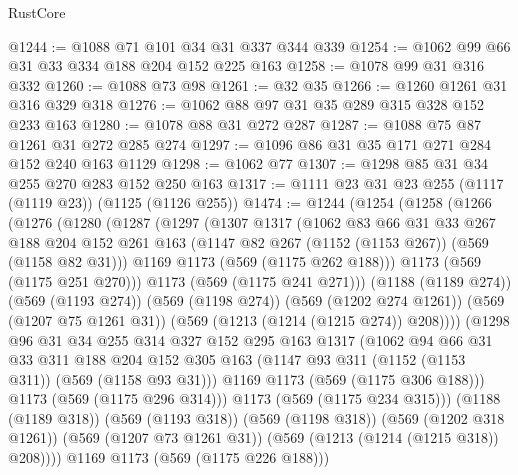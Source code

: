 \begin{lexlean}{RustCore}
\begin{coremodule}
@1244 := @1088 @71 @101 @34 @31 @337 @344 @339
@1254 := @1062 @99 @66 @31 @33 @334 @188 @204 @152 @225 @163
@1258 := @1078 @99 @31 @316 @332
@1260 := @1088 @73 @98
@1261 := @32 @35
@1266 := @1260 @1261 @31 @316 @329 @318
@1276 := @1062 @88 @97 @31 @35 @289 @315 @328 @152 @233 @163
@1280 := @1078 @88 @31 @272 @287
@1287 := @1088 @75 @87 @1261 @31 @272 @285 @274
@1297 := @1096 @86 @31 @35 @171 @271 @284 @152 @240 @163 @1129
@1298 := @1062 @77
@1307 := @1298 @85 @31 @34 @255 @270 @283 @152 @250 @163
@1317 := @1111 @23 @31 @23 @255 (@1117 (@1119 @23)) (@1125 (@1126 @255))
@1474 := @1244
    (@1254
      (@1258
        (@1266
          (@1276
            (@1280
              (@1287
                (@1297
                  (@1307
                    @1317
                    (@1062
                      @83
                      @66
                      @31
                      @33
                      @267
                      @188
                      @204
                      @152
                      @261
                      @163
                      (@1147 @82 @267 (@1152 (@1153 @267)) (@569 (@1158 @82 @31)))
                      @1169
                      @1173
                      (@569 (@1175 @262 @188)))
                    @1173
                    (@569 (@1175 @251 @270)))
                  @1173
                  (@569 (@1175 @241 @271)))
                (@1188 (@1189 @274))
                (@569 (@1193 @274))
                (@569 (@1198 @274))
                (@569 (@1202 @274 @1261))
                (@569 (@1207 @75 @1261 @31))
                (@569 (@1213 (@1214 (@1215 @274)) @208))))
            (@1298
              @96
              @31
              @34
              @255
              @314
              @327
              @152
              @295
              @163
              @1317
              (@1062
                @94
                @66
                @31
                @33
                @311
                @188
                @204
                @152
                @305
                @163
                (@1147 @93 @311 (@1152 (@1153 @311)) (@569 (@1158 @93 @31)))
                @1169
                @1173
                (@569 (@1175 @306 @188)))
              @1173
              (@569 (@1175 @296 @314)))
            @1173
            (@569 (@1175 @234 @315)))
          (@1188 (@1189 @318))
          (@569 (@1193 @318))
          (@569 (@1198 @318))
          (@569 (@1202 @318 @1261))
          (@569 (@1207 @73 @1261 @31))
          (@569 (@1213 (@1214 (@1215 @318)) @208))))
      @1169
      @1173
      (@569 (@1175 @226 @188)))

\end{coremodule}
\end{lexlean}
